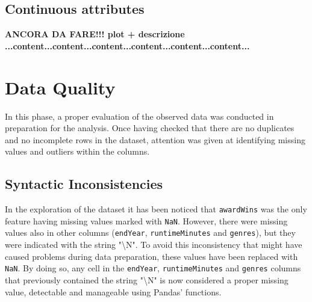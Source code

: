 \subsection{Continuous attributes}
\textbf{ANCORA DA FARE!!! plot + descrizione ...content...content...content...content...content...content...}


\section{Data Quality}\label{sec:data_quality}
In this phase, a proper evaluation of the observed data was conducted in preparation for the analysis.
Once having checked that there are no duplicates and no incomplete rows in the dataset, 
attention was given at identifying missing values and outliers within the columns.



\subsection{Syntactic Inconsistencies}
In the exploration of the dataset it has been noticed that \texttt{awardWins} was the only feature having missing values marked with \texttt{NaN}.
However, there were missing values also in other columns (\texttt{endYear}, \texttt{runtimeMinutes} and \texttt{genres}), 
but they were indicated with the string "\textbackslash N".
To avoid this inconsistency that might have caused problems during data preparation, these values have been replaced with \texttt{NaN}.
By doing so, any cell in the \texttt{endYear}, \texttt{runtimeMinutes} and \texttt{genres} columns 
that previously contained the string "\textbackslash N" is now considered a proper missing value, detectable and manageable using Pandas' functions.



